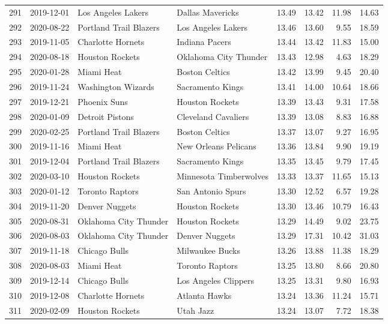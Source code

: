 \documentclass[
  11pt,
]{article}
\theoremstyle{nonumberplain}
\begin{document}
\begin{longtable}{rl|llr|rrr}
291 & 2019-12-01 & Los Angeles Lakers & Dallas Mavericks & 13.49 & 13.42 & 11.98 & 14.63\\
292 & 2020-08-22 & Portland Trail Blazers & Los Angeles Lakers & 13.46 & 13.60 & 9.55 & 18.59\\
293 & 2019-11-05 & Charlotte Hornets & Indiana Pacers & 13.44 & 13.42 & 11.83 & 15.00\\
294 & 2020-08-18 & Houston Rockets & Oklahoma City Thunder & 13.43 & 12.98 & 4.63 & 18.29\\
295 & 2020-01-28 & Miami Heat & Boston Celtics & 13.42 & 13.99 & 9.45 & 20.40\\
296 & 2019-11-24 & Washington Wizards & Sacramento Kings & 13.41 & 14.00 & 10.64 & 18.66\\
297 & 2019-12-21 & Phoenix Suns & Houston Rockets & 13.39 & 13.43 & 9.31 & 17.58\\
298 & 2020-01-09 & Detroit Pistons & Cleveland Cavaliers & 13.39 & 13.08 & 8.83 & 16.88\\
299 & 2020-02-25 & Portland Trail Blazers & Boston Celtics & 13.37 & 13.07 & 9.27 & 16.95\\
300 & 2019-11-16 & Miami Heat & New Orleans Pelicans & 13.36 & 13.84 & 9.90 & 19.19\\
301 & 2019-12-04 & Portland Trail Blazers & Sacramento Kings & 13.35 & 13.45 & 9.79 & 17.45\\
302 & 2020-03-10 & Houston Rockets & Minnesota Timberwolves & 13.33 & 13.37 & 11.65 & 15.13\\
303 & 2020-01-12 & Toronto Raptors & San Antonio Spurs & 13.30 & 12.52 & 6.57 & 19.28\\
304 & 2019-11-20 & Denver Nuggets & Houston Rockets & 13.30 & 13.46 & 10.79 & 16.43\\
305 & 2020-08-31 & Oklahoma City Thunder & Houston Rockets & 13.29 & 14.49 & 9.02 & 23.75\\
306 & 2020-08-03 & Oklahoma City Thunder & Denver Nuggets & 13.29 & 17.31 & 10.42 & 31.03\\
307 & 2019-11-18 & Chicago Bulls & Milwaukee Bucks & 13.26 & 13.88 & 11.38 & 18.29\\
308 & 2020-08-03 & Miami Heat & Toronto Raptors & 13.25 & 13.80 & 8.66 & 20.80\\
309 & 2019-12-14 & Chicago Bulls & Los Angeles Clippers & 13.25 & 13.31 & 9.80 & 16.93\\
310 & 2019-12-08 & Charlotte Hornets & Atlanta Hawks & 13.24 & 13.36 & 11.24 & 15.71\\
311 & 2020-02-09 & Houston Rockets & Utah Jazz & 13.24 & 13.07 & 7.72 & 18.38\\

\end{longtable}
\end{document}
